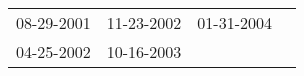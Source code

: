 \begin{supertabular}{llll}
 08-29-2001 &  11-23-2002 &  01-31-2004 \\
 04-25-2002 &  10-16-2003 &             \\
\end{supertabular}
